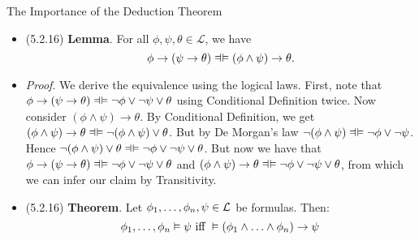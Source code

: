 \documentclass[../slides.tex]{subfiles}
\begin{document}
\begin{frame}{The Importance of the Deduction Theorem}

	\begin{itemize}
%	
		\item (5.2.16) \textbf{Lemma}. For all $\phi,\psi,\theta\in\mathcal{L}$, we have \[\phi\to(\psi\to\theta)\equi (\phi\land\psi)\to\theta.\]
		\item \emph{Proof}. We derive the equivalence using the logical laws. First, note that $\phi\to(\psi\to\theta)\equi \neg\phi\lor \neg \psi\lor \theta$ using Conditional Definition twice. Now consider $(\phi\land\psi)\to\theta$. By Conditional Definition, we get $(\phi\land\psi)\to\theta\equi \neg(\phi\land\psi)\lor\theta$. But by De Morgan's law $\neg(\phi\land\psi)\equi \neg\phi\lor\neg\psi$. Hence $\neg(\phi\land\psi)\lor\theta\equi  \neg\phi\lor\neg\psi\lor\theta$. But now we have that $\phi\to(\psi\to\theta)\equi \neg\phi\lor \neg \psi\lor \theta$ and $(\phi\land\psi)\to\theta\equi  \neg\phi\lor\neg\psi\lor\theta$, from which we can infer our claim by Transitivity. 

%	

	\item (5.2.16) \textbf{Theorem}. Let $\phi_1,\mathellipsis, \phi_n,\psi\in\mathcal{L}$ be formulas. Then:
	\[\phi_1,\mathellipsis, \phi_n\vDash \psi\text{ iff }\vDash (\phi_1\land\mathellipsis\land\phi_n)\to\psi\]

	\end{itemize}

\end{frame}
\end{document}
